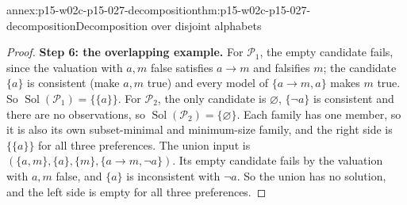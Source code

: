 \begin{annexitem}{annex:p15-w02c-p15-027-decomposition}{thm:p15-w02c-p15-027-decomposition}{Decomposition over disjoint alphabets}
\begin{proof}
\textbf{Step 6: the overlapping example.}\enspace
For \(\mathcal P_1\), the empty candidate fails, since the valuation with
\(a,m\) false satisfies \(a\to m\) and falsifies \(m\); the candidate
\(\{a\}\) is consistent (make \(a,m\) true) and every model of
\(\{a\to m,a\}\) makes \(m\) true. So
\(\operatorname{Sol}(\mathcal P_1)=\{\{a\}\}\). For \(\mathcal P_2\), the
only candidate is \(\varnothing\), \(\{\neg a\}\) is consistent and there
are no observations, so \(\operatorname{Sol}(\mathcal P_2)=\{\varnothing\}\).
Each family has one member, so it is also its own subset-minimal and
minimum-size family, and the right side is \(\{\{a\}\}\) for all three
preferences. The union input is
\((\{a,m\},\{a\},\{m\},\{a\to m,\neg a\})\). Its empty candidate fails by
the valuation with \(a,m\) false, and \(\{a\}\) is inconsistent with
\(\neg a\). So the union has no solution, and the left side is empty
for all three preferences.
\end{proof}
\end{annexitem}

